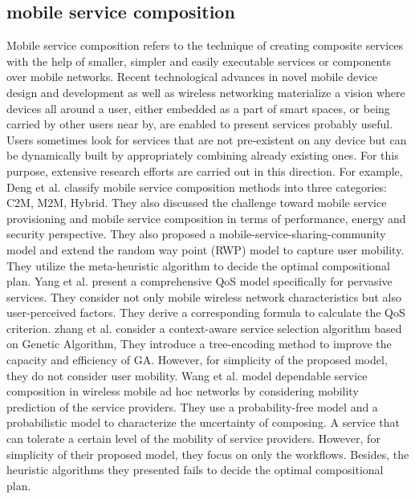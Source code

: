 \documentclass[10pt,journal,compsoc]{IEEEtran}
\begin{document}
\subsection{mobile service composition}
Mobile service composition refers to the technique of creating composite services with the help of smaller, simpler and easily executable services or components over mobile networks. Recent technological advances in novel mobile device design and development as well as wireless networking materialize a vision where devices all around a user, either embedded as a part of smart spaces, or being carried by other users
near by, are enabled to present services probably useful. Users sometimes look for services that are not pre-existent on any device but can be dynamically built by appropriately combining already existing ones. For this purpose, extensive research efforts are carried out in this direction. For example, Deng et al. \cite{Deng2016} classify mobile service composition methods into three categories: C2M, M2M, Hybrid. They also discussed the challenge toward mobile service provisioning and mobile service composition in terms of performance, energy and security perspective. They also proposed a mobile-service-sharing-community model and extend the random way point (RWP) model to capture user mobility. They utilize the meta-heuristic algorithm to decide the optimal compositional plan. Yang et al. \cite{Yang2010} present a comprehensive QoS model specifically for pervasive services. They consider not only mobile wireless network characteristics but also user-perceived factors. They derive a corresponding formula to calculate the QoS criterion. 
zhang et al. \cite{Zhang2016qos} consider a context-aware service selection algorithm based on Genetic Algorithm, They introduce a tree-encoding method to improve the capacity and efficiency of GA. However, for simplicity of the proposed model, they do not consider user mobility.
Wang et al. \cite{wang2011exploiting} model dependable service composition in wireless mobile ad hoc networks by considering mobility prediction of the service providers.
They use a probability-free model and a probabilistic model to characterize the uncertainty of composing. A service that can tolerate a certain level of the mobility of service providers. However, for simplicity of their proposed model, they focus on only the workflows. Besides, the heuristic algorithms they presented fails to decide the optimal compositional plan.
\end{document}
